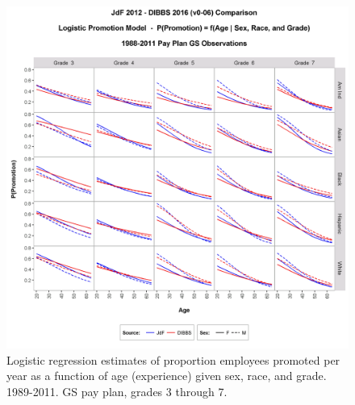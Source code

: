 \documentclass[10pt, letterpaper]{article}
\begin{document}
\begin{spacing}{1.0}
\begin{figure}[]
    \centering
    \includegraphics[width=6in, trim={0 0 0 1in}, clip]{PromotionSexRaceageGS3-7Model.png}
    \caption{Logistic regression estimates of proportion employees promoted per year as a function of age (experience) given sex, race, and grade.  1989-2011.  GS pay plan, grades 3 through 7.}
    \label{figure:PromotionSexRaceageGS3-7Model}
\end{figure}

\clearpage


\end{spacing}
\end{document}
